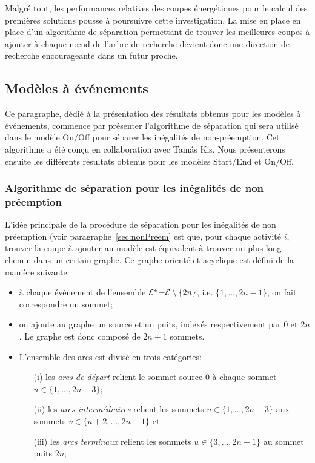 Malgré tout, les performances relatives des coupes énergétiques pour
le calcul des premières solutions pousse à poursuivre cette
investigation. La mise en place en place d'un algorithme de séparation
permettant de trouver les meilleures coupes à ajouter à chaque n\oe ud
de l'arbre de recherche devient donc une direction de recherche
encourageante dans un futur proche. 

\subsection{Modèles à événements}

Ce paragraphe, dédié à la présentation des résultats obtenus pour les
modèles à événements, commence par présenter l'algorithme de
séparation qui sera utilisé dans le modèle On/Off pour séparer les
inégalités de non-préemption. Cet algorithme a été conçu en
collaboration avec Tam{\'a}s Kis. Nous présenterons ensuite les
différents résultats obtenus pour les modèles Start/End et On/Off.

\subsubsection{Algorithme de séparation pour les inégalités de non
  préemption} 

L'idée principale de la procédure de séparation pour les inégalités de
non préemption (voir paragraphe~\ref{sec:nonPreem} est que, pour
chaque activité $i$, trouver la coupe à ajouter au modèle est
équivalent à trouver un plus long chemin dans un certain graphe. Ce
graphe orienté et acyclique est défini de la manière suivante:
\begin{itemize}
\item à chaque événement de l'ensemble ${\cal E}^*$=${\cal E} \setminus\{2n\}$,
i.e. $\{1,\dots,2n-1\}$, on fait correspondre un sommet;
\item on ajoute au graphe un source et un puits, indexés
respectivement par $0$ et $2n$. Le graphe est donc composé de $2n+1$
sommets.
\item L'ensemble des arcs est divisé en trois catégories:
  \begin{itemize}
  \item[(i)] les {\it arcs de départ} relient le sommet source $0$ à
chaque sommet $u \in \{1,\dots,2n-3\}$;
  \item[(ii)] les {\it arcs intermédiaires} relient les sommets $u \in
\{1,\dots, 2n-3\}$ aux sommets $v \in \{u+2,\dots,2n-1\}$ et
  \item[(iii)] les {\it arcs terminaux} relient les sommets $u \in
\{3,\dots,2n-1\}$ au sommet puits $2n$;
  \end{itemize}
\end{itemize}

